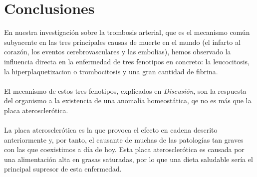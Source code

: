 \section{Conclusiones}
En nuestra investigación sobre la trombosis arterial, que es el mecanismo común subyacente en las tres principales causas de muerte en el mundo (el infarto al corazón, los eventos cerebrovasculares y las embolias), hemos observado la influencia directa en la enfermedad de tres fenotipos en concreto: la leucocitosis, la hiperplaquetizacion o trombocitosis y una gran cantidad de fibrina.\\\\
 El mecanismo de estos tres fenotipos, explicados en \textit{Discusión}, son la respuesta del organismo a la existencia de una anomalía homeostática, qe no es más que la placa aterosclerótica.\\\\

La placa aterosclerótica es la que provoca el efecto en cadena descrito anteriormente y, por tanto, el causante de muchas de las patologías tan graves con las que coexistimos a día de hoy. Esta placa aterosclerótica es causada por una alimentación alta en grasas saturadas, por lo que una dieta saludable sería el principal supresor de esta enfermedad.
